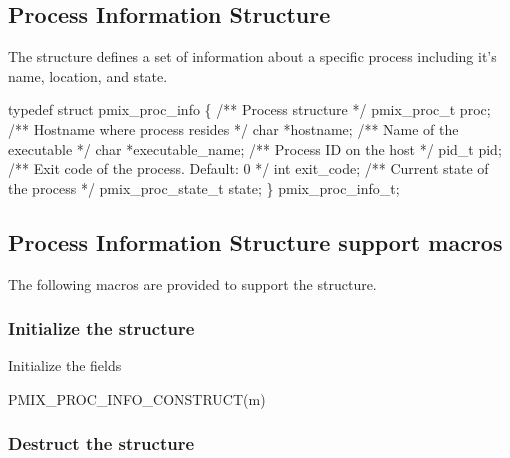 \subsection{Process Information Structure}

The  structure defines a set of information about a specific process including it's name, location, and state.

\cspecificstart
\begin{codepar}
typedef struct pmix_proc_info \{
    /** Process structure */
    pmix_proc_t proc;
    /** Hostname where process resides */
    char *hostname;
    /** Name of the executable */
    char *executable_name;
    /** Process ID on the host */
    pid_t pid;
    /** Exit code of the process. Default: 0 */
    int exit_code;
    /** Current state of the process */
    pmix_proc_state_t state;
\} pmix_proc_info_t;
\end{codepar}
\cspecificend


\subsection{Process Information Structure support macros}

The following macros are provided to support the  structure.

\subsubsection{Initialize the  structure}

Initialize the  fields

\cspecificstart
\begin{codepar}
PMIX_PROC_INFO_CONSTRUCT(m)
\end{codepar}
\cspecificend

\begin{arglist}
\end{arglist}

\subsubsection{Destruct the  structure}

